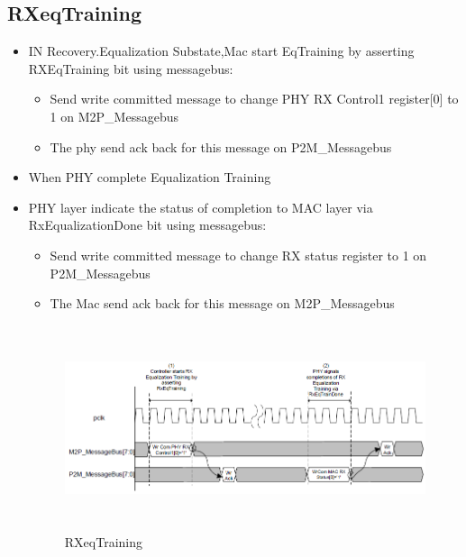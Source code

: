 \subsection{RXeqTraining} 
\begin{itemize}
    \item IN Recovery.Equalization Substate,Mac start EqTraining by asserting RXEqTraining bit using messagebus:
\begin{itemize}
    \item Send write committed message to change PHY RX Control1 register[0] to 1 on M2P\_Messagebus
\item The phy send ack back for this message on P2M\_Messagebus 

\end{itemize}
    \item When PHY complete Equalization Training 
    \item PHY layer indicate the status of completion to MAC layer via RxEqualizationDone bit using messagebus:
    \begin{itemize}
        \item  Send write committed message to change RX status register to 1  on P2M\_Messagebus
    \item The Mac send ack back for this message on M2P\_Messagebus


    \end{itemize}
    \begin{figure}[H]
  \centering
  \includegraphics[width=130mm,height=60mm]{images/clk_diagram/RXeqTraining.png}
  \caption{RXeqTraining}
  \label{lane}
\end{figure}
    
\end{itemize}
